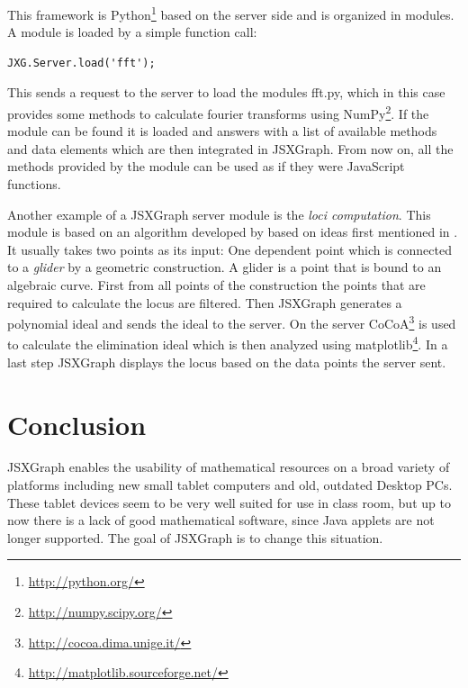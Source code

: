 \documentclass[12pt,a4paper]{article}%
\begin{document}
This framework is Python\footnote{\href{http://python.org/}{http://python.org/}} based on the server side and is
organized in modules. A module is loaded by a simple function call:

\begin{verbatim}
JXG.Server.load('fft');
\end{verbatim}

This sends a request to the server to load the modules fft.py, which in this case provides some methods to calculate
fourier transforms using NumPy\footnote{\href{http://numpy.scipy.org/}{http://numpy.scipy.org/}}. If the module can be
found it is loaded and answers with a list of available methods and data elements which are then integrated in JSXGraph.
From now on, all the methods provided by the module can be used as if they were JavaScript functions.

Another example of a JSXGraph server module is the \emph{loci computation}. This module is based on an algorithm
developed by \cite{botana} based on ideas first mentioned in \cite{recio}. It usually takes two points as its input: One
dependent point which is connected to a \emph{glider} by a geometric construction. A glider is a point that is bound to
an algebraic curve. First from all points of the construction the points that are required to calculate the locus are
filtered. Then JSXGraph generates a polynomial ideal and sends the ideal to the server. On the server
CoCoA\footnote{\href{http://cocoa.dima.unige.it/}{http://cocoa.dima.unige.it/}} is used to calculate the elimination ideal
which is then analyzed using matplotlib\footnote{\href{http://matplotlib.sourceforge.net/}{http://matplotlib.sourceforge.net/}}.
In a last step JSXGraph displays the locus based on the data points the server sent.

\section{Conclusion}
JSXGraph enables the usability of mathematical resources on a broad variety of 
platforms including new small tablet computers and old, outdated Desktop PCs. 
These tablet devices seem to be very well suited for use in class room, 
but up to now there is a lack of good mathematical software, since Java applets are not longer supported. 
The goal of JSXGraph is to change this situation. 
\end{document}
